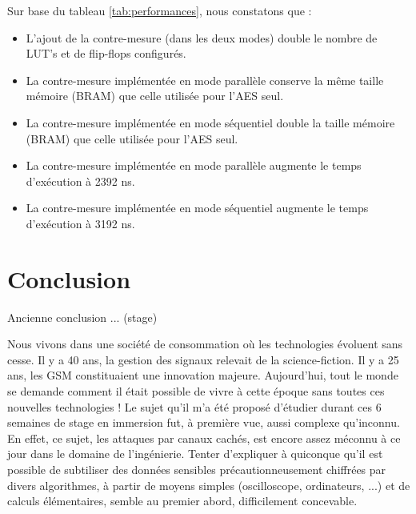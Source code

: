\documentclass[oneside]{book}
\begin{document}
\hspace{-0.5cm}Sur base du tableau \ref{tab:performances}, nous constatons que : 
\begin{itemize}
\item L'ajout de la contre-mesure (dans les deux modes) double le nombre de LUT's et de flip-flops configurés.
\item La contre-mesure implémentée en mode parallèle conserve la même taille mémoire (BRAM) que celle utilisée pour l'AES seul.
\item La contre-mesure implémentée en mode séquentiel double la taille mémoire (BRAM) que celle utilisée pour l'AES seul.
\item  La contre-mesure implémentée en mode parallèle augmente le temps d'exécution à 2392 \si{\nano\second}.
\item  La contre-mesure implémentée en mode séquentiel augmente le temps d'exécution à 3192 \si{\nano\second}.
\end{itemize}



\newpage


\chapter{Conclusion}

Ancienne conclusion ... (stage)

Nous vivons dans une société de consommation où les technologies évoluent sans cesse. Il y a 40 ans, la gestion des signaux relevait de la science-fiction. Il y a 25 ans, les GSM constituaient une innovation majeure. Aujourd’hui, tout le monde se demande comment il était possible de vivre à cette époque sans toutes ces nouvelles technologies ! Le sujet qu'il m'a été proposé d'étudier durant ces 6 semaines de stage en immersion fut, à première vue, aussi complexe qu'inconnu. En effet, ce sujet, les attaques par canaux cachés, est encore assez méconnu à ce jour dans le domaine de l'ingénierie. Tenter d'expliquer à quiconque qu'il est possible de subtiliser des données sensibles précautionneusement chiffrées par divers algorithmes, à partir de moyens simples (oscilloscope, ordinateurs, ...) et de calculs élémentaires, semble au premier abord, difficilement concevable. 
\end{document}
